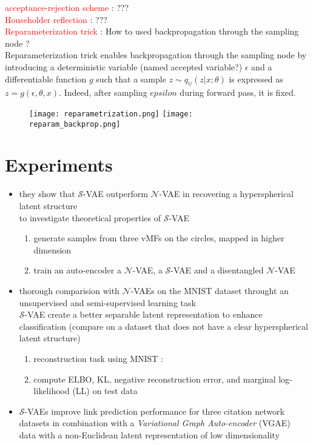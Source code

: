\documentclass[12pt]{article}
\newcommand{\n}{\mathcal{N}} %
\newcommand{\Ss}{\mathcal{S}} %
\newcommand{\red}[1]{\textcolor{red}{#1}}
\begin{document}
\red{acceptance-rejection scheme} : ???  \\ 
\red{Householder reflection} : ??? \\ 
\red{Reparameterization trick} :
How to used backpropagation through the sampling node ? \\
Reparameterization trick enables backpropagation through the sampling node by introducing a deterministic variable (named accepted variable?) $\epsilon$ and a differentiable function $g$ 
such that a sample $z\sim q_\psi(z|x; \theta)$ is expressed as $z=g(\epsilon, \theta, x)$. Indeed, after sampling $epsilon$ during forward pass, it is fixed.
\begin{figure}[!h]
    \texttt{[image: reparametrization.png]}
    \texttt{[image: reparam\_backprop.png]}
\end{figure}

\section{Experiments}

\begin{itemize}
    \item they show that $\mathcal{S}$-VAE outperform $\mathcal{N}$-VAE in recovering a hyperspherical latent structure \\ 
        to investigate theoretical properties of $\mathcal{S}$-VAE \\ 
        \begin{enumerate}
            \item generate samples from three vMFs on the circles, mapped in higher dimension 
            \item train an auto-encoder a $\n$-VAE, a $\Ss$-VAE and a disentangled $\n$-VAE
        \end{enumerate}
    \item thorough comparision with $\mathcal{N}$-VAEs on the MNIST dataset throught an unsupervised and semi-supervised learning task \\
            $\mathcal{S}$-VAE create a better separable latent representation to enhance classification
            (compare on a dataset that does not have a clear hyperspherical latent structure)
            \begin{enumerate}
                \item reconstruction task using MNIST : 
                \item compute ELBO, KL, negative reconstruction error, and marginal log-likelihood (LL) on test data
            \end{enumerate}
                
    \item $\mathcal{S}$-VAEs improve link prediction performance for three citation network datasets in combination with a \textit{Variational Graph Auto-encoder} (VGAE) \\
            data with a non-Euclidean latent representation of low dimensionality 
\end{itemize}
\end{document}
